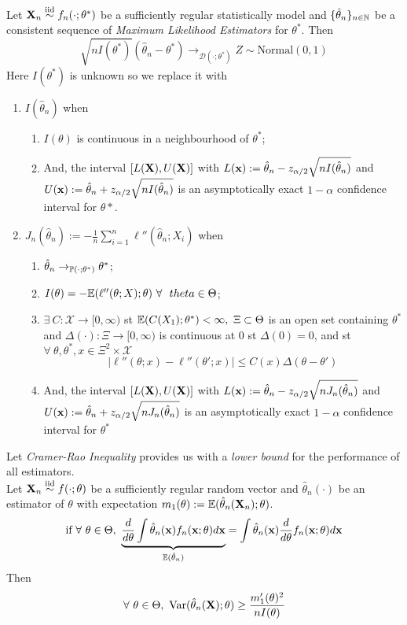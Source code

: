 \documentclass[11pt,a4paper]{article}
\begin{document}
Let $\textbf{X}_n\overset{\text{iid}}{\sim} f_n(\cdot;\theta^*)$ be a sufficiently regular statistically model and $\{\hat\theta_n\}_{n\in\mathbb{N}}$ be a consistent sequence of \textit{Maximum Likelihood Estimators} for $\theta^*$. Then
$$\sqrt{nI(\theta^*)}(\hat\theta_n-\theta^*)\to_{\mathcal{D}(\cdot;\theta^*)}Z\sim\text{Normal}(0,1)$$
Here $I(\theta^*)$ is unknown so we replace it with
\begin{enumerate}
	\item $I(\hat{\theta}_n)$ when
	\begin{enumerate}
		\item $I(\theta)$ is continuous in a neighbourhood of $\theta^*$;
		\item And, the interval $[L(\textbf{X}),U(\textbf{X})]$ with $L(\textbf{x}):=\hat{\theta}_n-z_{\alpha/2}\sqrt{nI(\hat{\theta}_n)}$ and ${U(\textbf{x}):=\hat{\theta}_n+z_{\alpha/2}\sqrt{nI(\hat{\theta}_n)}}$ is an asymptotically exact $1-\alpha$ confidence interval for $\theta*$.
	\end{enumerate}
	\item $J_n(\hat{\theta}_n):=-\frac{1}{n}\sum\limits_{i=1}^n\ell''(\hat{\theta}_n;X_i)$ when
	\begin{enumerate}
		\item $\hat\theta_n\to_{\mathbb{P}(\cdot;\theta^*)}\theta^*$;
		\item $I(\theta)=-\expect(\ell''(\theta;X);\theta)\ \forall\ \ theta\in\Theta$;
		\item $\exists\ C:\mathcal{X}\to[0,\infty)$ st $\expect(C(X_1);\theta^*)<\infty,\ \Xi\subset\Theta$ is an open set containing $\theta^*$ and $\Delta(\cdot):\Xi\to[0,\infty)$ is continuous at 0 st $\Delta(0)=0$, and st $\forall\ \theta,\theta^*,x\in \Xi^2\times\mathcal{X}$
		$$|\ell''(\theta;x)-\ell''(\theta';x)|\leq C(x)\Delta(\theta-\theta')$$
		\item And, the interval $[L(\textbf{X}),U(\textbf{X})]$ with $L(\textbf{x}):=\hat{\theta}_n-z_{\alpha/2}\sqrt{nJ_n(\hat{\theta}_n)}$ and ${U(\textbf{x}):=\hat{\theta}_n+z_{\alpha/2}\sqrt{nJ_n(\hat{\theta}_n)}}$ is an asymptotically exact $1-\alpha$ confidence interval for $\theta^*$
	\end{enumerate}
\end{enumerate}

Let \textit{Cramer-Rao Inequality} provides us with a \textit{lower bound} for the performance of all estimators.\\
Let $\textbf{X}_n\overset{\text{iid}}{\sim} f(\cdot;\theta)$ be a sufficiently regular random vector and $\hat\theta_n(\cdot)$ be an estimator of $\theta$ with expectation $m_1(\theta):=\mathbb{E}(\hat\theta_n(\textbf{X}_n);\theta)$.\\
$$\text{if }\forall\ \theta\in\Theta,\ \underbrace{\frac{d}{d\theta}\int\hat{\theta}_n(\x)f_n(\x;\theta)d\x}_{\expect(\hat{\theta}_n)}=\int\hat{\theta}_n(\x)\frac{d}{d\theta}f_n(\x;\theta)d\x$$
Then
$$\forall\ \theta\in\Theta,\ \var(\hat\theta_n(\X);\theta)\geq\frac{m_1'(\theta)^2}{nI(\theta)}$$
\end{document}
